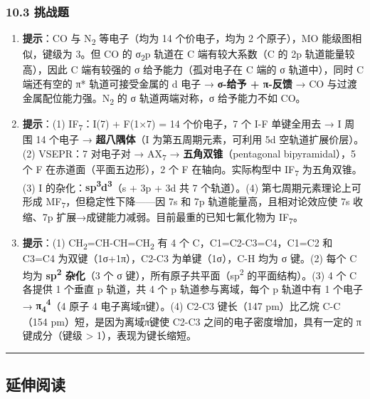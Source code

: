\documentclass[a4paper,11pt]{ctexart}
\begin{document}
\subsubsection{10.3 挑战题}\label{ux6311ux6218ux9898-1}

\begin{enumerate}
\def\labelenumi{\arabic{enumi}.}
\setcounter{enumi}{8}
\item
  \textbf{提示}：CO 与 N\textsubscript{2} 等电子（均为 14 个价电子，均为 2 个原子），MO 能级图相似，键级为 3。但 CO 的 σ\textsubscript{2}p 轨道在 C 端有较大系数（C 的 2p 轨道能量较高），因此 C 端有较强的 σ 给予能力（孤对电子在 C 端的 σ 轨道中），同时 C 端还有空的 π* 轨道可接受金属的 d 电子 → \textbf{σ-给予 + π-反馈} → CO 与过渡金属配位能力强。N\textsubscript{2} 的 σ 轨道两端对称，σ 给予能力不如 CO。
\item
  \textbf{提示}：(1) IF\textsubscript{7}：I(7) + F(1×7) = 14 个价电子，7 个 I-F 单键全用去 → I 周围 14 个电子 → \textbf{超八隅体}（I 为第五周期元素，可利用 5d 空轨道扩展价层）。(2) VSEPR：7 对电子对 → AX\textsubscript{7} → \textbf{五角双锥}（pentagonal bipyramidal），5 个 F 在赤道面（平面五边形），2 个 F 在轴向。实际构型中 IF\textsubscript{7} 为五角双锥。(3) I 的杂化：\textbf{sp\textsuperscript{3}d\textsuperscript{3}}（s + 3p + 3d 共 7 个轨道）。(4) 第七周期元素理论上可形成 MF\textsubscript{7}，但稳定性下降------因 7s 和 7p 轨道能量高，且相对论效应使 7s 收缩、7p 扩展→成键能力减弱。目前最重的已知七氟化物为 IF\textsubscript{7}。
\item
  \textbf{提示}：(1) CH\textsubscript{2}=CH-CH=CH\textsubscript{2} 有 4 个 C，C1=C2-C3=C4，C1=C2 和 C3=C4 为双键（1σ+1π），C2-C3 为单键（1σ），C-H 均为 σ 键。(2) 每个 C 均为 \textbf{sp\textsuperscript{2} 杂化}（3 个 σ 键），所有原子共平面（sp\textsuperscript{2} 的平面结构）。(3) 4 个 C 各提供 1 个垂直 p 轨道，共 4 个 p 轨道参与离域，每个 p 轨道中有 1 个电子 → \textbf{π\textsubscript{4}\textsuperscript{4}}（4 原子 4 电子离域π键）。(4) C2-C3 键长（147 pm）比乙烷 C-C（154 pm）短，是因为离域π键使 C2-C3 之间的电子密度增加，具有一定的 π 键成分（键级 \textgreater{} 1），表现为键长缩短。
\end{enumerate}

\begin{center}\rule{0.5\linewidth}{0.5pt}\end{center}

\subsection{延伸阅读}\label{ux5ef6ux4f38ux9605ux8bfb}
\end{document}
